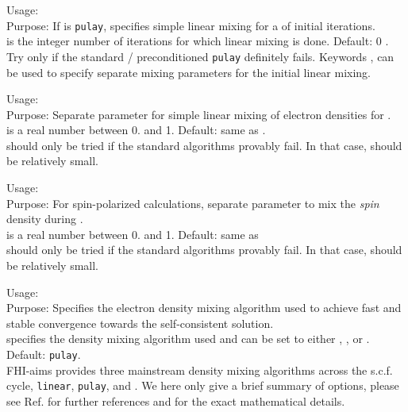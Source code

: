 {
  \noindent
  Usage:   \\[1.0ex]
  Purpose: If  is \texttt{pulay}, specifies simple
    linear mixing for a  of initial iterations. \\[1.0ex] 
   is the integer number of iterations for which linear
    mixing is done. Default: 0 . \\
}
Try only if the standard / preconditioned \texttt{pulay}
 definitely fails. Keywords
, 
can be used to specify separate mixing parameters for the initial
linear mixing. 

{
  \noindent
  Usage:   \\[1.0ex]
  Purpose: Separate parameter for simple linear mixing of electron
  densities for . \\[1.0ex] 
   is a real number between 0. and 1. Default: same as
  . \\ 
}
 should only be tried if the standard
algorithms provably fail. In that case,  should be
relatively small.

{
  \noindent
  Usage:   \\[1.0ex]
  Purpose: For spin-polarized calculations, separate parameter to mix 
    the \emph{spin} density during
  . \\[1.0ex]  
   is a real number between 0. and 1. Default: same as
   \\
}
 should only be tried if the standard
algorithms provably fail. In that case,  should be
relatively small.

{
  \noindent
  Usage:   \\[1.0ex]
  Purpose: Specifies the electron density mixing algorithm used to
    achieve fast and stable convergence towards the self-consistent 
    solution. \\[1.0ex]
   specifies the density mixing algorithm used and can
  be set to either , , or . Default: \texttt{pulay}. \\
}
FHI-aims provides three mainstream density mixing algorithms across the
s.c.f. cycle,  \texttt{linear}, \texttt{pulay}, and . We
here only give a brief summary of options, please see
Ref. \cite{Blum08} for further references and for the exact
mathematical details. 

